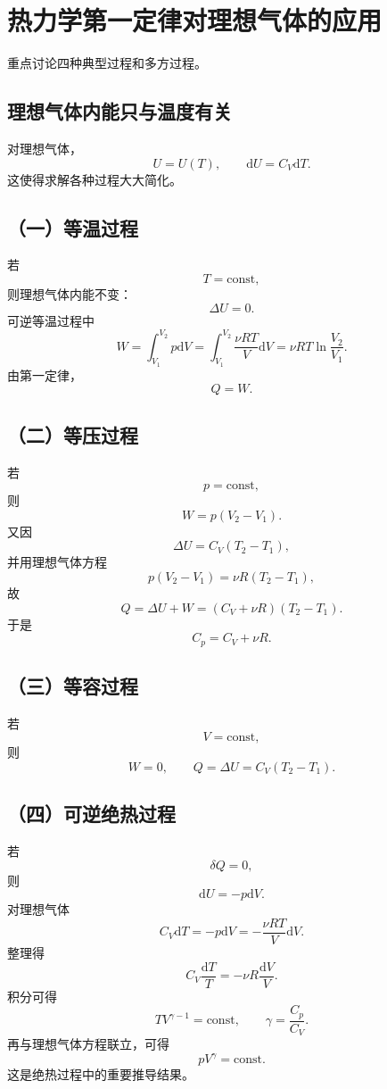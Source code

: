 \documentclass[11pt,a4paper,openany]{ctexbook}
\newcommand{\dd}{\mathrm d}
\newcommand{\const}{\mathrm{const}}
\begin{document}
\section{热力学第一定律对理想气体的应用}
重点讨论四种典型过程和多方过程。

\subsection*{理想气体内能只与温度有关}
对理想气体，
\[
U=U(T),
\qquad \dd U=C_V\dd T.
\]
这使得求解各种过程大大简化。

\subsection*{（一）等温过程}
若
\[
T=\const,
\]
则理想气体内能不变：
\[
\Delta U=0.
\]
可逆等温过程中
\[
W=\int_{V_1}^{V_2}p\dd V
=
\int_{V_1}^{V_2}\frac{\nu RT}{V}\dd V
=
\nu RT\ln\frac{V_2}{V_1}.
\]
由第一定律，
\[
Q=W.
\]

\subsection*{（二）等压过程}
若
\[
p=\const,
\]
则
\[
W=p(V_2-V_1).
\]
又因
\[
\Delta U=C_V(T_2-T_1),
\]
并用理想气体方程
\[
p(V_2-V_1)=\nu R(T_2-T_1),
\]
故
\[
Q=\Delta U+W=(C_V+\nu R)(T_2-T_1).
\]
于是
\[
\boxed{C_p=C_V+\nu R}.
\]

\subsection*{（三）等容过程}
若
\[
V=\const,
\]
则
\[
W=0,
\qquad
Q=\Delta U=C_V(T_2-T_1).
\]

\subsection*{（四）可逆绝热过程}
若
\[
\delta Q=0,
\]
则
\[
\dd U=-p\dd V.
\]
对理想气体
\[
C_V\dd T=-p\dd V=-\frac{\nu RT}{V}\dd V.
\]
整理得
\[
C_V\frac{\dd T}{T}=-\nu R\frac{\dd V}{V}.
\]
积分可得
\[
TV^{\gamma-1}=\const,
\qquad
\gamma=\frac{C_p}{C_V}.
\]
再与理想气体方程联立，可得
\[
\boxed{pV^\gamma=\const}.
\]
这是绝热过程中的重要推导结果。

\begin{center}
\end{center}
\end{document}
